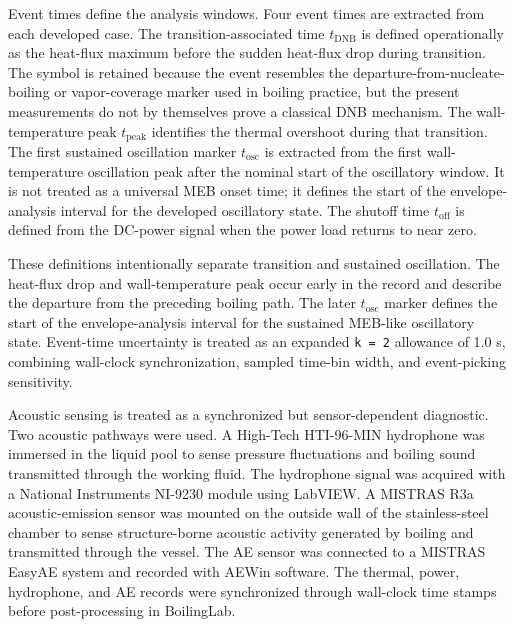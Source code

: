 \documentclass[final,1p,times]{elsarticle}
\begin{document}
Event times define the analysis windows. Four event times are extracted from each developed case. The transition-associated time $t_{\mathrm{DNB}}$ is defined operationally as the heat-flux maximum before the sudden heat-flux drop during transition. The symbol is retained because the event resembles the departure-from-nucleate-boiling or vapor-coverage marker used in boiling practice, but the present measurements do not by themselves prove a classical DNB mechanism. The wall-temperature peak $t_{\mathrm{peak}}$ identifies the thermal overshoot during that transition. The first sustained oscillation marker $t_{\mathrm{osc}}$ is extracted from the first wall-temperature oscillation peak after the nominal start of the oscillatory window. It is not treated as a universal MEB onset time; it defines the start of the envelope-analysis interval for the developed oscillatory state. The shutoff time $t_{\mathrm{off}}$ is defined from the DC-power signal when the power load returns to near zero.

These definitions intentionally separate transition and sustained oscillation. The heat-flux drop and wall-temperature peak occur early in the record and describe the departure from the preceding boiling path. The later $t_{\mathrm{osc}}$ marker defines the start of the envelope-analysis interval for the sustained MEB-like oscillatory state. Event-time uncertainty is treated as an expanded \texttt{k = 2} allowance of 1.0 s, combining wall-clock synchronization, sampled time-bin width, and event-picking sensitivity.

Acoustic sensing is treated as a synchronized but sensor-dependent diagnostic. Two acoustic pathways were used. A High-Tech HTI-96-MIN hydrophone was immersed in the liquid pool to sense pressure fluctuations and boiling sound transmitted through the working fluid. The hydrophone signal was acquired with a National Instruments NI-9230 module using LabVIEW. A MISTRAS R3a acoustic-emission sensor was mounted on the outside wall of the stainless-steel chamber to sense structure-borne acoustic activity generated by boiling and transmitted through the vessel. The AE sensor was connected to a MISTRAS EasyAE system and recorded with AEWin software. The thermal, power, hydrophone, and AE records were synchronized through wall-clock time stamps before post-processing in BoilingLab.
\end{document}
